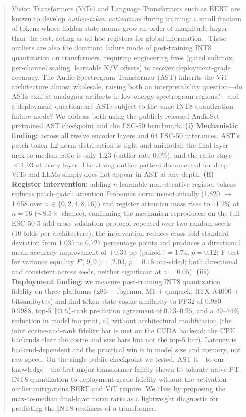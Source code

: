 \documentclass[conference]{IEEEtran}
\begin{document}
\begin{abstract}
Vision Transformers (ViTs) and Language Transformers such as BERT are known to develop \emph{outlier-token activations} during training: a small fraction of tokens whose hidden-state norms grow an order of magnitude larger than the rest, acting as ad-hoc registers for global information \cite{darcet2024need,bondarenko2023quantizable}. These outliers are also the dominant failure mode of post-training INT8 quantization on transformers, requiring engineering fixes (gated softmax, per-channel scaling, learnable K/V offsets) to recover deployment-grade accuracy. The Audio Spectrogram Transformer (AST) inherits the ViT architecture almost wholesale, raising both an interpretability question---do ASTs exhibit analogous artifacts in low-energy spectrogram regions?---and a deployment question: are ASTs subject to the same INT8-quantization failure mode? We address both using the publicly released AudioSet-pretrained AST checkpoint and the ESC-50 benchmark. \textbf{(i) Mechanistic finding:} across all twelve encoder layers and 64 ESC-50 utterances, AST's patch-token L2 norm distribution is tight and unimodal: the final-layer max-to-median ratio is only $1.23$ (outlier rate $0.0\%$), and the ratio stays $\leq 1.93$ at every layer. The strong outlier pattern documented for deep ViTs and LLMs simply does not appear in AST at any depth. \textbf{(ii) Register intervention:} adding $n$ learnable non-attentive register tokens \cite{darcet2024need} reduces patch--patch attention Frobenius norm monotonically (1.820 $\to$ 1.658 over $n \in \{0,2,4,8,16\}$) and register attention mass rises to $11.2\%$ at $n=16$ ($\sim 8.5\times$ chance), confirming the mechanism reproduces; on the full ESC-50 5-fold cross-validation protocol repeated over two random seeds (10 folds per architecture), the intervention reduces cross-fold standard deviation from $1.035$ to $0.727$ percentage points and produces a directional mean-accuracy improvement of $+0.33$ pp (paired $t = 1.74$, $p = 0.12$; F-test for variance equality $F(9,9)=2.03$, $p=0.15$ one-sided; both directional and consistent across seeds, neither significant at $\alpha=0.05$). \textbf{(iii) Deployment finding:} we measure post-training INT8 quantization fidelity on three platforms (x86 + fbgemm, M1 + qnnpack, RTX A4000 + bitsandbytes) and find token-state cosine similarity to FP32 of $0.980$--$0.9988$, top-5 \texttt{[CLS]}-rank prediction agreement of $0.73$--$0.95$, and a $49$--$74\%$ reduction in model footprint, all without architectural modification (the joint cosine-and-rank fidelity bar is met on the CUDA backend; the CPU backends clear the cosine and size bars but not the top-5 bar). Latency is backend-dependent and the practical win is in model size and memory, not raw speed. On the single public checkpoint we tested, AST is---to our knowledge---the first major transformer family shown to tolerate naive PT-INT8 quantization to deployment-grade fidelity without the activation-outlier mitigations BERT and ViT require. We close by proposing the max-to-median final-layer norm ratio as a lightweight diagnostic for predicting the INT8-readiness of a transformer.
\end{abstract}
\end{document}
